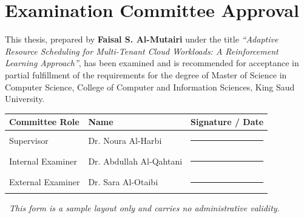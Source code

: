 \chapter*{Examination Committee Approval}
\thispagestyle{empty}

This thesis, prepared by \textbf{Faisal S. Al-Mutairi} under the title
\textit{``Adaptive Resource Scheduling for Multi-Tenant Cloud Workloads: A
Reinforcement Learning Approach''}, has been examined and is recommended for
acceptance in partial fulfillment of the requirements for the degree of
Master of Science in Computer Science, College of Computer and Information
Sciences, King Saud University.

\vspace{10pt}
\begin{center}
\renewcommand{\arraystretch}{1.7}
\begin{tabularx}{\textwidth}{@{}X X X@{}}
\toprule
\textbf{Committee Role} & \textbf{Name} & \textbf{Signature / Date} \\
\midrule
Supervisor        & Dr. Noura Al-Harbi     & \rule{3.2cm}{0.4pt} \\
Internal Examiner & Dr. Abdullah Al-Qahtani & \rule{3.2cm}{0.4pt} \\
External Examiner & Dr. Sara Al-Otaibi      & \rule{3.2cm}{0.4pt} \\
\bottomrule
\end{tabularx}
\end{center}

\vspace{16pt}
\noindent\faFile\ \textit{This form is a sample layout only and carries no
administrative validity.}

